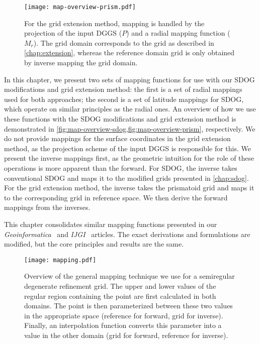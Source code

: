 \begin{figure}[ht!]
	\centering
	\texttt{[image: map-overview-prism.pdf]}
	\caption[The role of mapping functions for the grid extension method]{
		For the grid extension method, mapping is handled by the projection of the input DGGS ($P$) and a radial mapping function ($M_r$).
		The grid domain corresponds to the grid as described in \cref{chap:extension}, whereas the reference domain grid is only obtained by inverse mapping the grid domain.
	}
	\label{fig:map-overview-prism}
\end{figure}


In this chapter, we present two sets of mapping functions for use with our SDOG modifications and grid extension method:
the first is a set of radial mappings used for both approaches;
the second is a set of latitude mappings for SDOG, which operate on similar principles as the radial ones.
An overview of how we use these functions with the SDOG modifications and grid extension method is demonstrated in \cref{fig:map-overview-sdog,fig:map-overview-prism}, respectively.
We do not provide mappings for the surface coordinates in the grid extension method, as the projection scheme of the input DGGS is responsible for this.
We present the inverse mappings first, as the geometric intuition for the role of these operations is more apparent than the forward.
For SDOG, the inverse takes conventional SDOG and maps it to the modified grids presented in \cref{chap:sdog}.
For the grid extension method, the inverse takes the prismatoid grid and maps it to the corresponding grid in reference space.
We then derive the forward mappings from the inverses.


This chapter consolidates similar mapping functions presented in our \textit{Geoinformatica}~\cite{ulmer2020toward} and \textit{IJGI}~\cite{ulmer2020general} articles.
The exact derivations and formulations are modified, but the core principles and results are the same.



\begin{figure}[tb!]
	\centering
	\texttt{[image: mapping.pdf]}
	\caption[Overview of mapping for semiregular degenerate refinement grids]{
		Overview of the general mapping technique we use for a semiregular degenerate refinement grid.
		The upper and lower values of the regular region containing the point are first calculated in both domains.
		The point is then parameterized between these two values in the appropriate space (reference for forward, grid for inverse).
		Finally, an interpolation function converts this parameter into a value in the other domain (grid for forward, reference for inverse).
	}
	\label{fig:mapping}
\end{figure}


